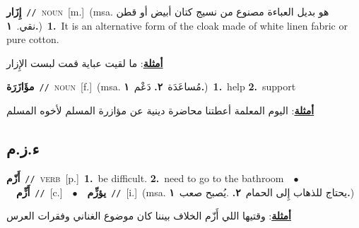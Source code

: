 \documentclass[10pt,a4paper,twoside]{article} %
\begin{document}
\begin{multicols}{2}
{\setlength\topsep{0pt}\textbf{\foreignlanguage{arabic}{إِزَار}}\ {\color{gray}\texttt{//}\color{black}}\ \textsc{noun}\ [m.]\ \color{gray}(msa. \foreignlanguage{arabic}{هو بديل العباءة مصنوع من نسيج كتان أبيض أو قطن نقي.}~\foreignlanguage{arabic}{\textbf{١.}})\color{black}\ \textbf{1.}~It is an  alternative form of the cloak made of white linen fabric or pure cotton.\  \begin{flushright}\color{gray}\foreignlanguage{arabic}{\textbf{\underline{\foreignlanguage{arabic}{أمثلة}}}: ما لقيت عباية قمت لبست الإِزار}\end{flushright}\color{black}} \vspace{2mm}

{\setlength\topsep{0pt}\textbf{\foreignlanguage{arabic}{مؤَازَرَة}}\ {\color{gray}\texttt{//}\color{black}}\ \textsc{noun}\ [f.]\ \color{gray}(msa. \foreignlanguage{arabic}{مُساعَدَة}~\foreignlanguage{arabic}{\textbf{٢.}}  \foreignlanguage{arabic}{دَعْم}~\foreignlanguage{arabic}{\textbf{١.}})\color{black}\ \textbf{1.}~help  \textbf{2.}~support\  \begin{flushright}\color{gray}\foreignlanguage{arabic}{\textbf{\underline{\foreignlanguage{arabic}{أمثلة}}}: اليوم المعلمة أعطتنا محاضرة دينية عن مؤازرة المسلم لأخوه المسلم}\end{flushright}\color{black}} \vspace{2mm}

\vspace{-3mm}
\subsection*{\color{blue}\foreignlanguage{arabic}{ء.ز.م}\color{blue}{}} 

{\setlength\topsep{0pt}\textbf{\foreignlanguage{arabic}{أَزّم}}\ {\color{gray}\texttt{//}\color{black}}\ \textsc{verb}\ [p.]\ \textbf{1.}~be difficult.  \textbf{2.}~need to go to the bathroom\ \ $\bullet$\ \ \setlength\topsep{0pt}\textbf{\foreignlanguage{arabic}{أَزِّم}}\ {\color{gray}\texttt{//}\color{black}}\ [c.]\ \ $\bullet$\ \ \setlength\topsep{0pt}\textbf{\foreignlanguage{arabic}{يؤزِّم}}\ {\color{gray}\texttt{//}\color{black}}\ [i.]\ \color{gray}(msa. \foreignlanguage{arabic}{يحتاج للذهاب إِلى الحمام}~\foreignlanguage{arabic}{\textbf{٢.}}  .\foreignlanguage{arabic}{يُصبح صعب}~\foreignlanguage{arabic}{\textbf{١.}})\color{black}\  \begin{flushright}\color{gray}\foreignlanguage{arabic}{\textbf{\underline{\foreignlanguage{arabic}{أمثلة}}}: وقتيها اللي أَزّم الخلاف بيننا كان موضوع الغناني وفقرات العرس}\end{flushright}\color{black}} \vspace{2mm}


\end{multicols}
\end{document}
